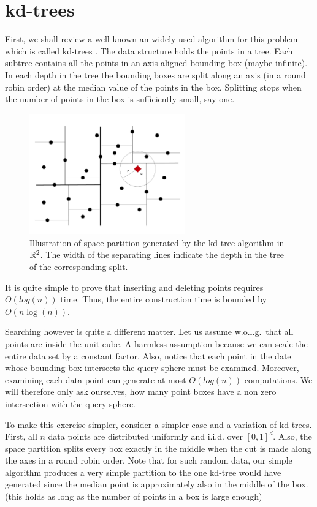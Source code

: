 \documentclass{article}
\begin{document}
\section{kd-trees}
First, we shall review a well known an widely used algorithm for this problem which is called kd-trees \cite{Bentley75}.
The data structure holds the points in a tree. 
Each subtree contains all the points in an axis aligned bounding box (maybe infinite).
In each depth in the tree the bounding boxes are split along an axis (in a round robin order) at the median value of the points in the box.
Splitting stops when the number of points in the box is sufficiently small, say one. 


\begin{figure}[h!]
  \centering
  \includegraphics[width=0.6\textwidth]{11_images/nns.pdf}
  \caption{Illustration of space partition generated by the kd-tree algorithm in ${\mathbb{R}}^2$. 
  The width of the separating lines indicate the depth in the tree of the corresponding split.}
\end{figure}
It is quite simple to prove that inserting and deleting points requires $O(log(n))$ time.
Thus, the entire construction time is bounded by $O(n\log(n))$.

Searching however is quite a different matter.
Let us assume w.o.l.g.\ that all points are inside the unit cube. 
A harmless assumption because we can scale the entire data set by a constant factor.
Also, notice that each point in the date whose bounding box intersects the query sphere must be
examined. Moreover, examining each data point can generate at most $O(log(n))$ computations.
We will therefore only ask ourselves, how many point boxes have a non zero intersection with the query sphere.

To make this exercise simpler, consider a simpler case and a variation of kd-trees.
First, all $n$ data points are distributed uniformly and i.i.d. over $[0,1]^{d}$.
Also, the space partition splits every box exactly in the middle when the cut is
made along the axes in a round robin order.
Note that for such random data, our simple algorithm produces a very simple partition to the
one kd-tree would have generated since the median point is approximately also in the middle of the box.
(this holds as long as the number of points in a box is large enough)
\end{document}
